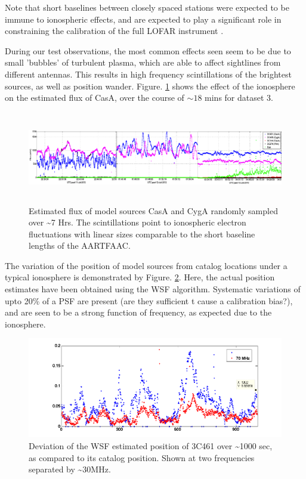 \documentclass{aa}
\begin{document}
Note that short baselines between closely spaced stations were expected
to be immune to ionospheric effects, and are expected to play a significant
role in constraining the calibration of the full LOFAR instrument
\cite{vdTol2007selfcallofar}. 

During our test observations, the most common effects seen seem to
be due to small 'bubbles' of turbulent plasma, which are able to affect
sightlines from different antennas. This results in high frequency
scintillations of the brightest sources, as well as position wander.
Figure. \ref{fig:Estimated-flux-of} shows the effect of the ionosphere
on the estimated flux of CasA, over the course of $\sim18$ mins for
dataset 3.

\begin{figure}[tbh]
\includegraphics[width=1\textwidth,height=4cm]{Figs/combined_plot_utc_tstamp}

\caption{\label{fig:Estimated-flux-of}Estimated flux of model sources CasA
and CygA randomly sampled over \textasciitilde{}7 Hrs. The scintillations
point to ionospheric electron fluctuations with linear sizes comparable
to the short baseline lengths of the AARTFAAC.}
\end{figure}


The variation of the position of model sources from catalog locations
under a typical ionosphere is demonstrated by Figure. \ref{fig:Deviation-of-the}.
Here, the actual position estimates have been obtained using the WSF
algorithm. Systematic variations of upto 20\% of a PSF are present
(are they sufficient t cause a calibration bias?), and are seen to
be a strong function of frequency, as expected due to the ionosphere.

\begin{figure}[tbh]
\includegraphics[width=1.1\columnwidth]{Figs/nighttime_SB0_wsf_deviation_to_SB4_try}

\caption{\label{fig:Deviation-of-the}Deviation of the WSF estimated position
of 3C461 over \textasciitilde{}1000 sec, as compared to its catalog
position. Shown at two frequencies separated by \textasciitilde{}30MHz.}
\end{figure}
\end{document}
